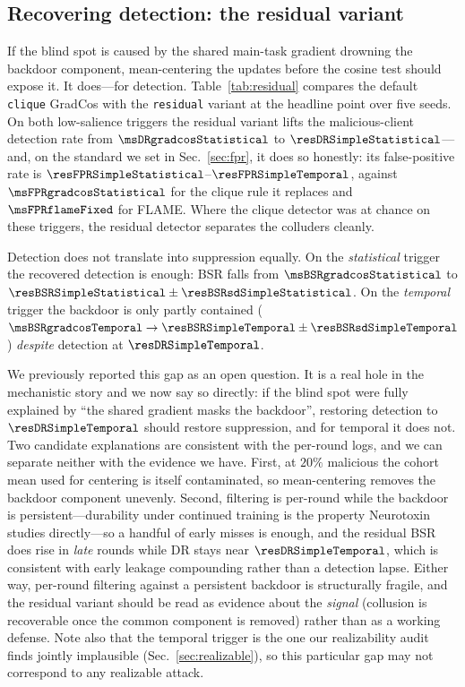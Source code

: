 \subsection{Recovering detection: the residual variant}
\label{sec:residual}

If the blind spot is caused by the shared main-task gradient drowning the
backdoor component, mean-centering the updates before the cosine test should
expose it. It does---for detection. Table~\ref{tab:residual} compares the default
\texttt{clique} GradCos with the \texttt{residual} variant at the headline point
over five seeds. On both low-salience triggers the residual variant lifts the
malicious-client detection rate from $\msDRgradcosStatistical$ to
$\resDRSimpleStatistical$---and, on the standard we set in Sec.~\ref{sec:fpr}, it
does so honestly: its false-positive rate is
$\resFPRSimpleStatistical$--$\resFPRSimpleTemporal$, against
$\msFPRgradcosStatistical$ for the clique rule it replaces and
$\msFPRflameFixed$ for FLAME. Where the clique detector was at chance on these triggers, the
residual detector separates the colluders cleanly.

Detection does not translate into suppression equally. On the \emph{statistical}
trigger the recovered detection is enough: BSR falls from
$\msBSRgradcosStatistical$ to $\resBSRSimpleStatistical\pm\resBSRsdSimpleStatistical$.
On the \emph{temporal} trigger the backdoor is only partly contained
($\msBSRgradcosTemporal\rightarrow\resBSRSimpleTemporal\pm\resBSRsdSimpleTemporal$)
\emph{despite} detection at $\resDRSimpleTemporal$.

We previously reported this gap as an open question. It is a real hole in the
mechanistic story and we now say so directly: if the blind spot were fully
explained by ``the shared gradient masks the backdoor'', restoring detection to
$\resDRSimpleTemporal$ should restore suppression, and for temporal it does not. Two candidate
explanations are consistent with the per-round logs, and we can separate neither
with the evidence we have. First, at $20\%$ malicious the cohort mean used for
centering is itself contaminated, so mean-centering removes the backdoor component
unevenly. Second, filtering is per-round while the backdoor is persistent---durability
under continued training is the property Neurotoxin~\cite{zhang2022neurotoxin}
studies directly---so a handful of early misses is enough, and the
residual BSR does rise in \emph{late} rounds while DR stays near
$\resDRSimpleTemporal$, which is
consistent with early leakage compounding rather than a detection lapse. Either
way, per-round filtering against a persistent backdoor is structurally fragile,
and the residual variant should be read as evidence about the \emph{signal}
(collusion is recoverable once the common component is removed) rather than as a
working defense. Note also that the temporal trigger is the one our realizability
audit finds jointly implausible (Sec.~\ref{sec:realizable}), so this particular
gap may not correspond to any realizable attack.

